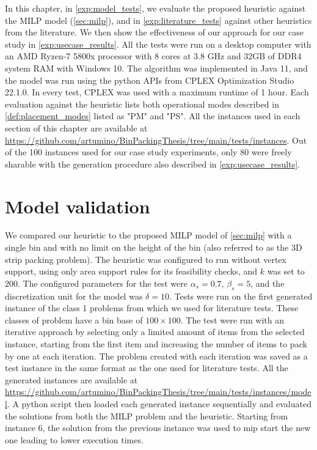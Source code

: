 In this chapter, in \cref{exp:model_tests}, we evaluate the proposed heuristic against the MILP model (\ref{sec:milp}), and in \cref{exp:literature_tests} against other heuristics from the literature. We then show the effectiveness of our approach for our case study in \cref{exp:usecase_results}.
All the tests were run on a desktop computer with an AMD Ryzen-7 5800x processor with 8 cores at 3.8 GHz and 32GB of DDR4 system RAM with Windows 10. The algorithm was implemented in Java 11, and the model was run using the python APIs from CPLEX Optimization Studio 22.1.0.
In every test, CPLEX was used with a maximum runtime of 1 hour.
Each evaluation against the heuristic lists both operational modes described in \cref{def:placement_modes} listed as "PM" and "PS".
All the instances used in each section of this chapter are available at \url{https://github.com/artumino/BinPackingThesis/tree/main/tests/instances}.
Out of the 100 instances used for our case study experiments, only 80 were freely sharable with the generation procedure also described in \cref{exp:usecase_results}.

\section{Model validation}
We compared our heuristic to the proposed MILP model of \cref{sec:milp} with a single bin and with no limit on the height of the bin (also referred to as the 3D strip packing problem).
The heuristic was configured to run without vertex support, using only area support rules for its feasibility checks, and $k$ was set to $200$.
The configured parameters for the test were $\alpha_s = 0.7$, $\beta_s = 5$, and the discretization unit for the model was $\delta = 10$. 
Tests were run on the first generated instance of the class 1 problems from \citep{martello2000three} which we used for literature tests. These classes of problem have a bin base of $100 \times 100$.
The test were run with an iterative approach by selecting only a limited amount of items from the selected instance, starting from the first item and increasing the number of items to pack by one at each iteration.
The problem created with each iteration was saved as a test instance in the same format as the one used for literature tests.
All the generated instances are available at \url{https://github.com/artumino/BinPackingThesis/tree/main/tests/instances/model}.
A python script then loaded each generated instance sequentially and evaluated the solutions from both the MILP problem and the heuristic. %
Starting from instance 6, the solution from the previous instance was used to mip start the new one leading to lower execution times.


